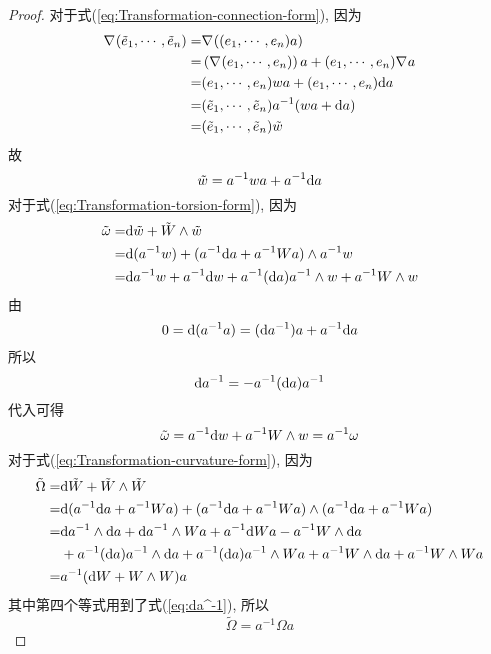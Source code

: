        \begin{proof}
            对于式(\ref{eq:Transformation-connection-form}), 因为
            \begin{align*}
                \nabla_{}{(\tilde{e}_1,\cdots,\tilde{e}_n)} =& \nabla_{}{\left((e_1,\cdots,e_n)a\right)} \\
                =& \left(\nabla_{}{(e_1,\cdots,e_n)}\right)a + (e_1,\cdots,e_n)\nabla_{}{a} \\
                =& (e_1,\cdots,e_n)wa + (e_1,\cdots,e_n){\rm d} a \\
                =& (\tilde{e}_1,\cdots,\tilde{e}_n)a^{-1}(wa + {\rm d} a) \\
                =& (\tilde{e}_1,\cdots,\tilde{e}_n)\tilde{w}
            \end{align*}
            故
            \begin{equation*}
                \tilde{w} = a^{-1}wa + a^{-1}{\rm d} a
            \end{equation*}
            对于式(\ref{eq:Transformation-torsion-form}), 因为
            \begin{align*}
                \tilde{\omega} =& {\rm d}\tilde{w} + \tilde{W}\wedge\tilde{w} \\
                =& {\rm d}(a^{-1}w) + (a^{-1}{\rm d} a + a^{-1}Wa)\wedge a^{-1}w \\
                =& {\rm d} a^{-1}w + a^{-1}{\rm d} w + a^{-1}({\rm d} a)a^{-1}\wedge w + a^{-1}W\wedge w
            \end{align*}
            由
            \begin{equation*}
                0 = {\rm d}(a^{-1}a) = ({\rm d} a^{-1})a + a^{-1}{\rm d} a
            \end{equation*}
            所以
            \begin{equation}\label{eq:da^-1}
                {\rm d} a^{-1} = -a^{-1}({\rm d} a)a^{-1}
            \end{equation}
            代入可得
            \begin{equation*}
                \tilde{\omega} = a^{-1}{\rm d} w + a^{-1}W\wedge w = a^{-1}\omega
            \end{equation*}
            对于式(\ref{eq:Transformation-curvature-form}), 因为
            \begin{align*}
                \tilde{\Omega} =& {\rm d}\tilde{W} + \tilde{W}\wedge\tilde{W} \\
                =& {\rm d}(a^{-1}{\rm d} a + a^{-1}Wa) + (a^{-1}{\rm d} a + a^{-1}Wa)\wedge(a^{-1}{\rm d} a + a^{-1}Wa) \\
                =& {\rm d} a^{-1}\wedge{\rm d} a + {\rm d} a^{-1}\wedge Wa + a^{-1}{\rm d} Wa - a^{-1}W\wedge{\rm d} a \\
                &+ a^{-1}({\rm d} a)a^{-1}\wedge{\rm d} a + a^{-1}({\rm d} a)a^{-1}\wedge Wa + a^{-1}W\wedge{\rm d} a + a^{-1}W\wedge Wa \\
                =& a^{-1}({\rm d} W + W\wedge W)a
            \end{align*}
            其中第四个等式用到了式(\ref{eq:da^-1}), 所以
            \begin{equation*}
                \tilde{\Omega} = a^{-1}\Omega a
            \end{equation*}
        \end{proof}
